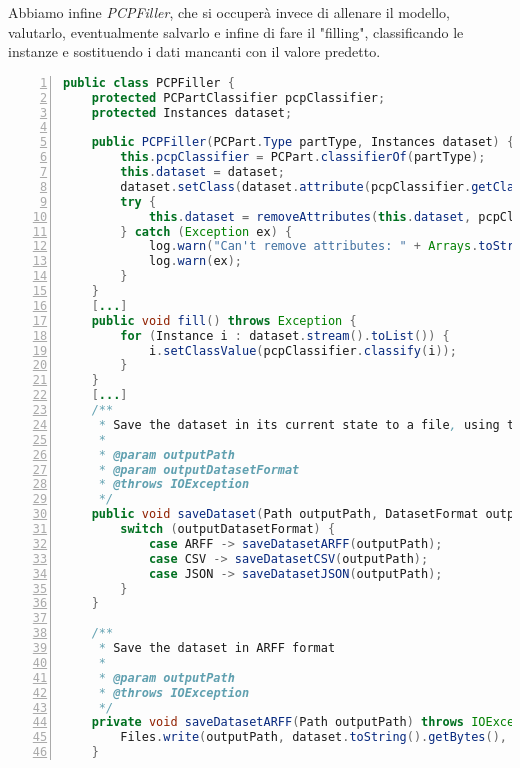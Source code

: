 \documentclass[12pt]{report}
\begin{document}
Abbiamo infine \textit{PCPFiller}, che si occuperà invece di allenare il modello,
valutarlo, eventualmente salvarlo e infine di fare il "filling", classificando
le instanze e sostituendo i dati mancanti con il valore predetto.
\begin{lstlisting}[language=Java, numbers=left, basicstyle=\scriptsize\ttfamily, breaklines=true]
public class PCPFiller {
	protected PCPartClassifier pcpClassifier;
	protected Instances dataset;

	public PCPFiller(PCPart.Type partType, Instances dataset) {
		this.pcpClassifier = PCPart.classifierOf(partType);
		this.dataset = dataset;
		dataset.setClass(dataset.attribute(pcpClassifier.getClassName()));
		try {
			this.dataset = removeAttributes(this.dataset, pcpClassifier.getAttributesToIgnore());
		} catch (Exception ex) {
			log.warn("Can't remove attributes: " + Arrays.toString(pcpClassifier.getAttributesToIgnore()));
			log.warn(ex);
		}
	}
	[...]
	public void fill() throws Exception {
		for (Instance i : dataset.stream().toList()) {
			i.setClassValue(pcpClassifier.classify(i));
		}
	}
	[...]
	/**
	 * Save the dataset in its current state to a file, using the specified format
	 *
	 * @param outputPath
	 * @param outputDatasetFormat
	 * @throws IOException
	 */
	public void saveDataset(Path outputPath, DatasetFormat outputDatasetFormat) throws IOException {
		switch (outputDatasetFormat) {
			case ARFF -> saveDatasetARFF(outputPath);
			case CSV -> saveDatasetCSV(outputPath);
			case JSON -> saveDatasetJSON(outputPath);
		}
	}

	/**
	 * Save the dataset in ARFF format
	 *
	 * @param outputPath
	 * @throws IOException
	 */
	private void saveDatasetARFF(Path outputPath) throws IOException {
		Files.write(outputPath, dataset.toString().getBytes(), StandardOpenOption.CREATE);
	}
\end{lstlisting}
\end{document}

